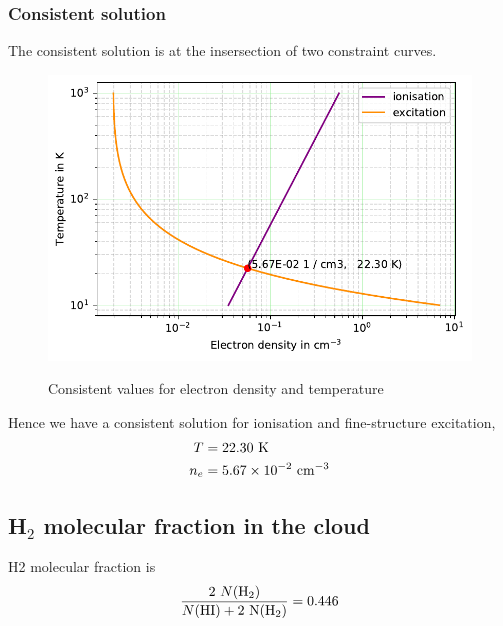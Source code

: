 \documentclass{jhwhw}
\begin{document}
\newpage
\subsubsection{Consistent solution}
The consistent solution is at the insersection of two constraint curves.
\begin{figure}[H]
\centering
\caption{Consistent values for electron density and temperature}
\includegraphics[width=1\linewidth]{../prob-3-plot-3}
\label{fig:prob-3-plot-3}
\end{figure}
Hence we have a consistent solution for ionisation and fine-structure excitation,
\begin{align}
T &= 22.30 ~\rm{K}\\
n_e &= 5.67 \times 10^{-2} ~\rm{cm^{-3}}
\end{align}





















\solution
\subsection{H$_2$ molecular fraction in the cloud}
H2 molecular fraction is 
\begin{align}
\frac{2~N(\rm{H_{2}})}{N(\rm{HI}) + 2~N(\rm{H_{2}})} = 0.446
\end{align}
\end{document}
